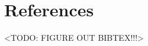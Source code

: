 \documentclass[acmsmall]{acmart}
\begin{document}



\section*{References}

<TODO: FIGURE OUT BIBTEX!!!>

\end{document}
